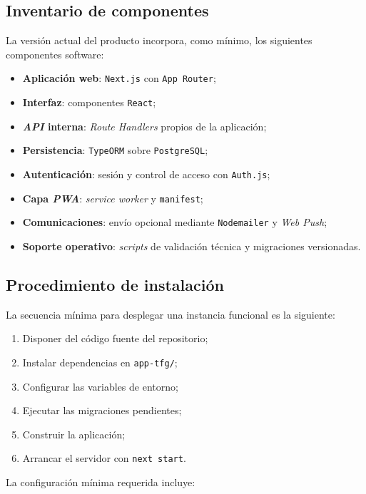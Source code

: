 \subsection{Inventario de componentes}

La versión actual del producto incorpora, como mínimo, los siguientes componentes software:

\begin{itemize}
    \item \textbf{Aplicación web}: \texttt{Next.js} con \texttt{App Router};
    \item \textbf{Interfaz}: componentes \texttt{React};
    \item \textbf{\textit{API} interna}: \textit{Route Handlers} propios de la aplicación;
    \item \textbf{Persistencia}: \texttt{TypeORM} sobre \texttt{PostgreSQL};
    \item \textbf{Autenticación}: sesión y control de acceso con \texttt{Auth.js};
    \item \textbf{Capa \textit{PWA}}: \textit{service worker} y \texttt{manifest};
    \item \textbf{Comunicaciones}: envío opcional mediante \texttt{Nodemailer} y \textit{Web Push};
    \item \textbf{Soporte operativo}: \textit{scripts} de validación técnica y migraciones versionadas.
\end{itemize}

\subsection{Procedimiento de instalación}

La secuencia mínima para desplegar una instancia funcional es la siguiente:

\begin{enumerate}
    \item Disponer del código fuente del repositorio;
    \item Instalar dependencias en \texttt{app-tfg/};
    \item Configurar las variables de entorno;
    \item Ejecutar las migraciones pendientes;
    \item Construir la aplicación;
    \item Arrancar el servidor con \texttt{next start}.
\end{enumerate}

La configuración mínima requerida incluye:

